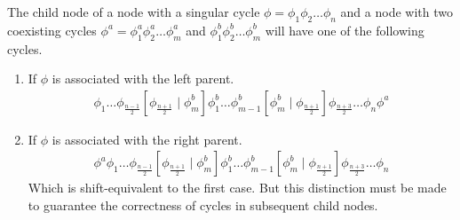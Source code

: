 \begin{theorem}
	The child node of a node with a singular cycle $\phi = \phi_1\phi_2 \dots \phi_n$ and a node with two coexisting cycles $\phi^a = \phi^a_1\phi^a_2 \dots \phi^a_m$ and $\phi^b_1\phi^b_2 \dots \phi^b_m$ will have one of the following cycles.
	\begin{enumerate}
		\item If $\phi$ is associated with the left parent.
		      \begin{align*}
			      \phi_1 \dots \phi_{\frac{n-1}{2}} \left[\phi_{\frac{n+1}{2}} \mid \phi^b_m\right]
			      \phi^b_1 \dots \phi^b_{m-1} \left[\phi^b_m \mid \phi_{\frac{n+1}{2}}\right]
			      \phi_{\frac{n+3}{2}} \dots \phi_n \phi^a
		      \end{align*}
		\item If $\phi$ is associated with the right parent.
		      \begin{align*}
			      \phi^a \phi_1 \dots \phi_{\frac{n-1}{2}} \left[\phi_{\frac{n+1}{2}} \mid \phi^b_m\right]
			      \phi^b_1 \dots \phi^b_{m-1} \left[\phi^b_m \mid \phi_{\frac{n+1}{2}}\right]
			      \phi_{\frac{n+3}{2}} \dots \phi_n
		      \end{align*}
		      Which is shift-equivalent to the first case.
		      But this distinction must be made to guarantee the correctness of cycles in subsequent child nodes.
	\end{enumerate}
\end{theorem}

